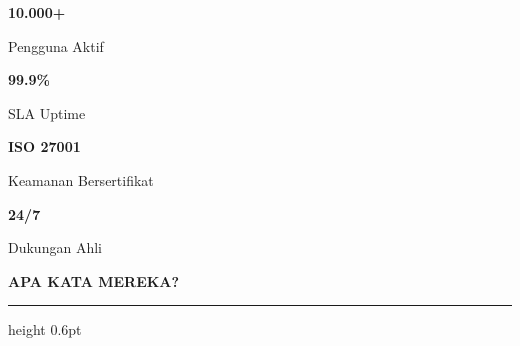 \documentclass[a4paper]{article}
\newcommand{\sectiontitle}[1]{%
    \vspace{10pt}%
    {\fontsize{13}{16}\selectfont\bfseries\color{BlueDark} #1}\par\vspace{3pt}%
    {\color{BluePrimary}\hrule height 0.6pt}\par\vspace{8pt}%
}
\begin{document}
\noindent
\colorbox{BluePrimary}{%
\begin{minipage}{\dimexpr\textwidth-2\fboxsep}
\vspace{6pt}
\hspace{6pt}%
\begin{minipage}[t]{0.24\linewidth}
    \begin{center}
        {\fontsize{18}{22}\selectfont\bfseries\color{White} 10.000+}\par
        {\fontsize{8}{10}\selectfont\color{BlueMid} Pengguna Aktif}
    \end{center}
\end{minipage}%
\hfill
\begin{minipage}[t]{0.24\linewidth}
    \begin{center}
        {\fontsize{18}{22}\selectfont\bfseries\color{White} 99.9\%}\par
        {\fontsize{8}{10}\selectfont\color{BlueMid} SLA Uptime}
    \end{center}
\end{minipage}%
\hfill
\begin{minipage}[t]{0.24\linewidth}
    \begin{center}
        {\fontsize{18}{22}\selectfont\bfseries\color{White} ISO 27001}\par
        {\fontsize{8}{10}\selectfont\color{BlueMid} Keamanan Bersertifikat}
    \end{center}
\end{minipage}%
\hfill
\begin{minipage}[t]{0.24\linewidth}
    \begin{center}
        {\fontsize{18}{22}\selectfont\bfseries\color{White} 24/7}\par
        {\fontsize{8}{10}\selectfont\color{BlueMid} Dukungan Ahli}
    \end{center}
\end{minipage}%
\hspace{6pt}%
\vspace{6pt}
\end{minipage}}

\sectiontitle{APA KATA MEREKA?}
\end{document}
